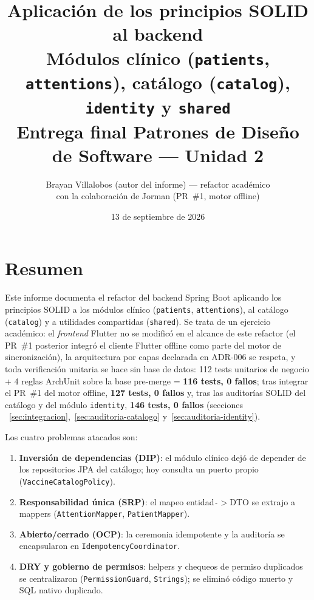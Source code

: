 \documentclass[11pt,a4paper]{article}
\title{\textbf{Aplicación de los principios SOLID al backend}\\
  \large Módulos clínico (\texttt{patients}, \texttt{attentions}),
  catálogo (\texttt{catalog}), \texttt{identity} y \texttt{shared} \\[4pt]
  \normalsize Entrega final \textbf{Patrones de Diseño de Software} ---
  Unidad 2}
\author{Brayan Villalobos (autor del informe) --- refactor académico\\
  \small con la colaboración de Jorman (PR~\#1, motor offline)}
\date{13 de septiembre de 2026}
\begin{document}
\maketitle

\tableofcontents
\newpage

\section{Resumen}

Este informe documenta el refactor del backend Spring Boot aplicando los
principios SOLID a los módulos clínico (\texttt{patients},
\texttt{attentions}), al catálogo (\texttt{catalog}) y a utilidades
compartidas (\texttt{shared}). Se trata de un ejercicio académico: el
\textit{frontend} Flutter no se modificó en el alcance de este refactor (el
PR~\#1 posterior integró el cliente Flutter offline como parte del motor de
sincronización), la arquitectura por capas declarada en
ADR-006 se respeta, y toda verificación unitaria se hace sin base de datos:
112 tests unitarios de negocio + 4 reglas ArchUnit sobre la base pre-merge
= \textbf{116 tests, 0 fallos}; tras integrar el PR~\#1 del motor offline,
\textbf{127 tests, 0 fallos} y, tras las auditorías SOLID del catálogo y del
módulo \texttt{identity}, \textbf{146 tests, 0 fallos} (secciones
~\ref{sec:integracion},~\ref{sec:auditoria-catalogo}
y~\ref{sec:auditoria-identity}).

Los cuatro problemas atacados son:

\begin{enumerate}
  \item \textbf{Inversión de dependencias (DIP)}: el módulo clínico dejó de
        depender de los repositorios JPA del catálogo; hoy consulta un puerto
        propio (\texttt{VaccineCatalogPolicy}).
  \item \textbf{Responsabilidad única (SRP)}: el mapeo entidad\texttt{-}$>$DTO
        se extrajo a mappers (\texttt{AttentionMapper}, \texttt{PatientMapper}).
  \item \textbf{Abierto/cerrado (OCP)}: la ceremonia idempotente y la auditoría
        se encapsularon en \texttt{IdempotencyCoordinator}.
  \item \textbf{DRY y gobierno de permisos}: helpers y chequeos de permiso
        duplicados se centralizaron (\texttt{PermissionGuard}, \texttt{Strings});
        se eliminó código muerto y SQL nativo duplicado.
\end{enumerate}
\end{document}
